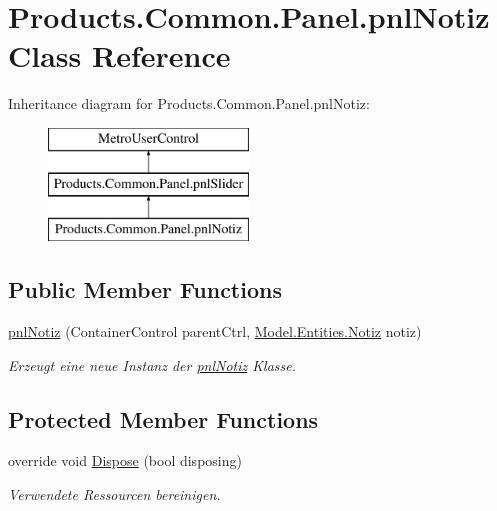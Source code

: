 \hypertarget{class_products_1_1_common_1_1_panel_1_1pnl_notiz}{}\section{Products.\+Common.\+Panel.\+pnl\+Notiz Class Reference}
\label{class_products_1_1_common_1_1_panel_1_1pnl_notiz}
Inheritance diagram for Products.\+Common.\+Panel.\+pnl\+Notiz\+:\begin{figure}[H]
\begin{center}
\leavevmode
\includegraphics[height=3.000000cm]{class_products_1_1_common_1_1_panel_1_1pnl_notiz}
\end{center}
\end{figure}
\subsection*{Public Member Functions}
\begin{DoxyCompactItemize}
\item 
\hyperlink{class_products_1_1_common_1_1_panel_1_1pnl_notiz_a426eff2fb7518a5fd8f8c3dac97aba98}{pnl\+Notiz} (Container\+Control parent\+Ctrl, \hyperlink{class_products_1_1_model_1_1_entities_1_1_notiz}{Model.\+Entities.\+Notiz} notiz)
\begin{DoxyCompactList}\small\item\em Erzeugt eine neue Instanz der \hyperlink{class_products_1_1_common_1_1_panel_1_1pnl_notiz}{pnl\+Notiz} Klasse. \end{DoxyCompactList}\end{DoxyCompactItemize}
\subsection*{Protected Member Functions}
\begin{DoxyCompactItemize}
\item 
override void \hyperlink{class_products_1_1_common_1_1_panel_1_1pnl_notiz_a4c664c35460359fc59df7d75fc9fdf80}{Dispose} (bool disposing)
\begin{DoxyCompactList}\small\item\em Verwendete Ressourcen bereinigen. \end{DoxyCompactList}\end{DoxyCompactItemize}
